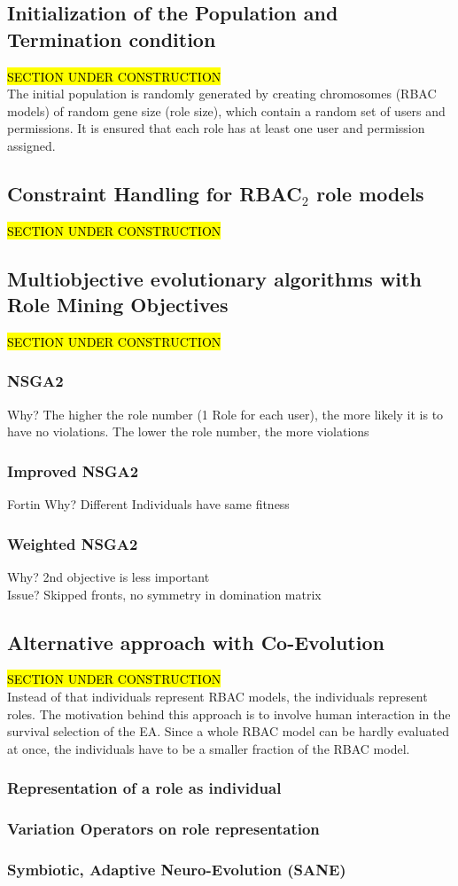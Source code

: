     \subsection{Initialization of the Population and Termination condition}
    \hl{SECTION UNDER CONSTRUCTION}\\
    The initial population is randomly generated by creating chromosomes (RBAC models) of random gene size (role size), which contain a random set of users and permissions. It is ensured that each role has at least one user and permission assigned.
    
    \subsection{Constraint Handling for RBAC$_2$ role models}
    \hl{SECTION UNDER CONSTRUCTION}\\
    
    \subsection{Multiobjective evolutionary algorithms with Role Mining Objectives}
    \hl{SECTION UNDER CONSTRUCTION}\\
        \subsubsection{NSGA2}
        Why? The higher the role number (1 Role for each user), the more likely it is to have no violations. The lower the role number, the more violations
        \subsubsection{Improved NSGA2}
        Fortin
        Why? Different Individuals have same fitness
        \subsubsection{Weighted NSGA2}
        Why? 2nd objective is less important\\
        Issue? Skipped fronts, no symmetry in domination matrix

    \subsection{Alternative approach with Co-Evolution}
    \hl{SECTION UNDER CONSTRUCTION}\\
    Instead of that individuals represent RBAC models, the individuals represent roles. The motivation behind this approach is to involve human interaction in the survival selection of the EA. Since a whole RBAC model can be hardly evaluated at once, the individuals have to be a smaller fraction of the RBAC model.
        \subsubsection{Representation of a role as individual}
        \subsubsection{Variation Operators on role representation}
        \subsubsection{Symbiotic, Adaptive Neuro-Evolution (SANE)}
